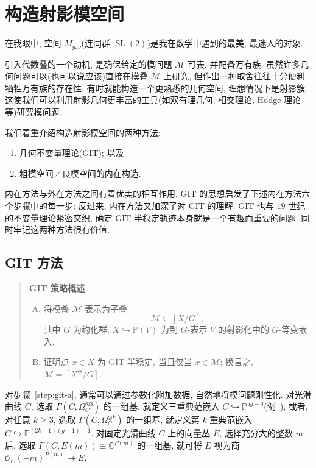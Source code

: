 \section{构造射影模空间}\label{src:1.7}
\begin{epigraph}
在我眼中, 空间 $M_{g,\nu}$(连同群 $\operatorname{SL}(2)$)是我在数学中遇到的最美, 最迷人的对象.
\end{epigraph}
引入代数叠的一个动机, 是确保给定的模问题 $\mathcal M$ 可表, 并配备万有族. 虽然许多几何问题可以(也可以说应该)直接在模叠 $\mathcal M$ 上研究, 但作出一种取舍往往十分便利: 牺牲万有族的存在性, 有时就能构造一个更熟悉的几何空间, 理想情况下是射影簇. 这使我们可以利用射影几何更丰富的工具(如双有理几何, 相交理论, Hodge 理论等)研究模问题.

我们着重介绍构造射影模空间的两种方法: 
\begin{enumerate}[(1)]
\item 几何不变量理论(GIT); 以及
\item 粗模空间／良模空间的内在构造.
\end{enumerate}
内在方法与外在方法之间有着优美的相互作用. GIT 的思想启发了下述内在方法六个步骤中的每一步; 反过来, 内在方法又加深了对 GIT 的理解. GIT 也与 $19$ 世纪的不变量理论紧密交织, 确定 GIT 半稳定轨迹本身就是一个有趣而重要的问题. 同时牢记这两种方法很有价值.

\subsection{GIT 方法}\label{src:1.7.1-subsection}
\begin{quote}
\begin{center}\textbf{GIT 策略概述}\end{center}
\begin{enumerate}[(A)]
\item\label{step:git-a} 将模叠 $\mathcal M$ 表示为子叠
\[
\mathcal M\subseteq[X/G],
\]
其中 $G$ 为约化群, $X\hookrightarrow\mathbb P(V)$ 为到 $G$-表示 $V$ 的射影化中的 $G$-等变嵌入.
\item\label{step:git-b} 证明点 $x\in X$ 为 GIT 半稳定, 当且仅当 $x\in\mathcal M$; 换言之, $\mathcal M=[X^{\mathrm{ss}}/G]$.
\end{enumerate}
\end{quote}
对步骤~\ref{step:git-a}, 通常可以通过参数化附加数据, 自然地将模问题刚性化. 对光滑曲线 $C$, 选取 $\Gamma(C,\Omega_C^{\otimes3})$ 的一组基, 就定义三重典范嵌入 $C\hookrightarrow\mathbb P^{5g-6}$(例~); 或者, 对任意 $k\geq3$, 选取 $\Gamma(C,\Omega_C^{\otimes k})$ 的一组基, 就定义第 $k$ 重典范嵌入 $C\hookrightarrow\mathbb P^{(2k-1)(g-1)-1}$. 对固定光滑曲线 $C$ 上的向量丛 $E$, 选择充分大的整数 $m$ 后, 选取 $\Gamma(C,E(m))\cong\mathbb C^{P(m)}$ 的一组基, 就可将 $E$ 视为商 $\mathcal O_C(-m)^{P(m)}\twoheadrightarrow E$.

